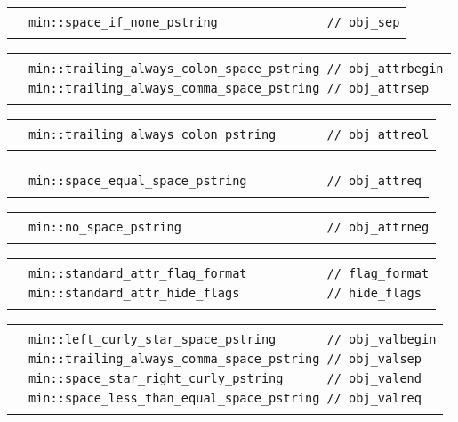 \documentclass[12pt]{article}
\newenvironment{indpar}[1][0.3in]%
	{\begin{list}{}%
		     {\setlength{\itemsep}{0in}%
		      \setlength{\topsep}{0in}%
		      \setlength{\parsep}{1ex}%
		      \setlength{\labelwidth}{#1}%
		      \setlength{\leftmargin}{#1}%
		      \addtolength{\leftmargin}{\labelsep}}%
	 \item}%
	{\end{list}}
\newlength{\ARGBREAKLENGTH}
\newcommand{\ARGBREAK}[1][\ARGBREAKLENGTH]{\\&\hspace*{#1}}
\begin{document}
\begin{indpar}[1em]
\vspace{-4ex}\begin{tabular}{r@{}l}\hspace*{0.1in}\ARGBREAK
\verb|min::space_if_none_pstring               // obj_sep|\ARGBREAK
\end{tabular}

\vspace{-4ex}\begin{tabular}{r@{}l}\hspace*{0.1in}\ARGBREAK
\verb|min::trailing_always_colon_space_pstring // obj_attrbegin|\ARGBREAK
\verb|min::trailing_always_comma_space_pstring // obj_attrsep|\ARGBREAK
\end{tabular}

\vspace{-4ex}\begin{tabular}{r@{}l}\hspace*{0.1in}\ARGBREAK
\verb|min::trailing_always_colon_pstring       // obj_attreol|\ARGBREAK
\end{tabular}

\vspace{-4ex}\begin{tabular}{r@{}l}\hspace*{0.1in}\ARGBREAK
\verb|min::space_equal_space_pstring           // obj_attreq|\ARGBREAK
\end{tabular}

\vspace{-4ex}\begin{tabular}{r@{}l}\hspace*{0.1in}\ARGBREAK
\verb|min::no_space_pstring                    // obj_attrneg|\ARGBREAK
\end{tabular}

\vspace{-4ex}\begin{tabular}{r@{}l}\hspace*{0.1in}\ARGBREAK
\verb|min::standard_attr_flag_format           // flag_format|\ARGBREAK
\verb|min::standard_attr_hide_flags            // hide_flags|\ARGBREAK
\end{tabular}

\vspace{-4ex}\begin{tabular}{r@{}l}\hspace*{0.1in}\ARGBREAK
\verb|min::left_curly_star_space_pstring       // obj_valbegin|\ARGBREAK
\verb|min::trailing_always_comma_space_pstring // obj_valsep|\ARGBREAK
\verb|min::space_star_right_curly_pstring      // obj_valend|\ARGBREAK
\verb|min::space_less_than_equal_space_pstring // obj_valreq|\ARGBREAK
\end{tabular}

\end{indpar}
\end{document}
